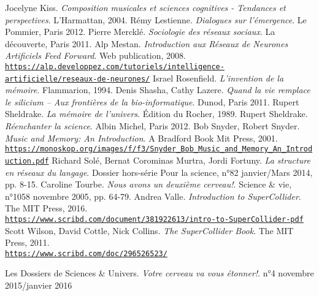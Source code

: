 \begin{thebibliography}{99}
        \bibitem[-, 2004]{}Jocelyne Kiss. \textit{Composition musicales et sciences cognitives - Tendances et perspectives}. L'Harmattan, 2004.
        \bibitem[-, 2012]{}Rémy Lestienne. \textit{Dialogues sur l'émergence}. Le Pommier, Paris 2012.
        \bibitem[-, 2011]{}Pierre Mercklé. \textit{Sociologie des réseaux sociaux}. La découverte, Paris 2011.
        \bibitem[-, 2008]{}Alp Mestan. \textit{Introduction aux Réseaux de Neurones Artificiels Feed Forward}. Web publication, 2008.\\ \href{https://alp.developpez.com/tutoriels/intelligence-artificielle/reseaux-de-neurones/}{\scriptsize{\texttt{https://alp.developpez.com/tutoriels/intelligence-artificielle/reseaux-de-neurones/}}} \normalsize{}
        \bibitem[-, 1994]{}Israel Rosenfield. \textit{L'invention de la mémoire}. Flammarion, 1994.
        \bibitem[-, 2011]{}Denis Shasha, Cathy Lazere. \textit{Quand la vie remplace le silicium -- Aux frontières de la bio-informatique}. Dunod, Paris 2011.
        \bibitem[-, 1989]{}Rupert Sheldrake. \textit{La mémoire de l'univers}. Édition du Rocher, 1989.
        \bibitem[-, 2012]{}Rupert Sheldrake. \textit{Réenchanter la science}. Albin Michel, Paris 2012.
         Bob Snyder, Robert Snyder. \textit{Music and Memory: An Introduction}. A Bradford Book Mit Press, 2001.\\ \href{https://monoskop.org/images/f/f3/Snyder\_Bob\_Music\_and\_Memory\_An\_Introduction.pdf}{\scriptsize{\texttt{https://monoskop.org/images/f/f3/Snyder\_Bob\_Music\_and\_Memory\_An\_Introduction.pdf}}} \normalsize{}
        \bibitem[-, 2014]{}Richard Solé, Bernat Corominas Murtra, Jordi Fortuny. \textit{La structure en réseaux du langage}. Dossier hors-série Pour la science, n°82 janvier/Mars 2014, pp. 8-15.        
        \bibitem[-, 2005]{}Caroline Tourbe. \textit{Nous avons un deuxième cerveau!}. Science \& vie, n°1058 novembre 2005, pp. 64-79.
        \bibitem[-, 2016]{}Andrea Valle. \textit{Introduction to SuperCollider}. The MIT Press, 2016.\\ \href{https://www.scribd.com/document/381922613/intro-to-SuperCollider-pdf}{\scriptsize{\texttt{https://www.scribd.com/document/381922613/intro-to-SuperCollider-pdf}}} \normalsize{}
        \bibitem[-, 2011]{}Scott Wilson, David Cottle, Nick Collins. \textit{The SuperCollider Book}. The MIT Press, 2011.\\ \href{https://www.scribd.com/doc/296526523/The-Supercollider-Book-Scott-Wilson-David-Cottle-Nick-Collins}{\scriptsize{\texttt{https://www.scribd.com/doc/296526523/}}} \normalsize{}
                
        \bibitem[-, 2016]{}Les Dossiers de Sciences \& Univers. \textit{Votre cerveau va vous étonner!}. n°4 novembre 2015/janvier 2016
        
\end{thebibliography}